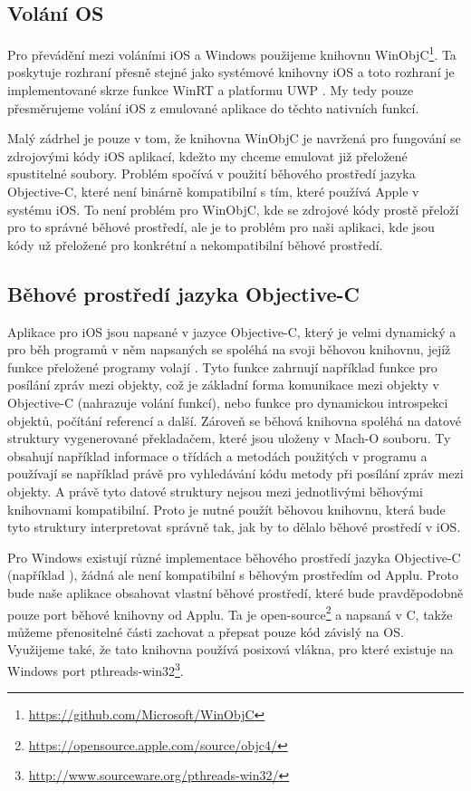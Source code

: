 \documentclass[12pt]{article}
\newcommand{\Rplus}{\protect\hspace{-.1em}\protect\raisebox{.35ex}{\smaller{\smaller\textbf{+}}}}
\newcommand{\Cpp}{\mbox{C\Rplus\Rplus}\xspace}
\begin{document}
\subsection*{Volání OS}
\label{sec:winobjc}

Pro převádění mezi voláními iOS a Windows použijeme knihovnu WinObjC\footnote{\url{https://github.com/Microsoft/WinObjC}}.
Ta poskytuje rozhraní přesně stejné jako systémové knihovny iOS a toto rozhraní je implementované skrze funkce WinRT a platformu UWP \cite{winobjc}.
My tedy pouze přesměrujeme volání iOS z emulované aplikace do těchto nativních funkcí.

Malý zádrhel je pouze v tom, že knihovna WinObjC je navržená pro fungování se zdrojovými kódy iOS aplikací, kdežto my chceme emulovat již přeložené spustitelné soubory.
Problém spočívá v použití běhového prostředí jazyka Objective-C, které není binárně kompatibilní s tím, které používá Apple v systému iOS.
To není problém pro WinObjC, kde se zdrojové kódy prostě přeloží pro to správné běhové prostředí, ale je to problém pro naši aplikaci, kde jsou kódy už přeložené pro konkrétní a nekompatibilní běhové prostředí.

\subsection*{Běhové prostředí jazyka Objective-C}

Aplikace pro iOS jsou napsané v jazyce Objective-C, který je velmi dynamický a pro běh programů v něm napsaných se spoléhá na svoji běhovou knihovnu, jejíž funkce přeložené programy volají \cite{objc, understandingObjc}.
Tyto funkce zahrnují například funkce pro posílání zpráv mezi objekty, což je základní forma komunikace mezi objekty v Objective-C (nahrazuje volání funkcí), nebo funkce pro dynamickou introspekci objektů, počítání referencí a další.
Zároveň se běhová knihovna spoléhá na datové struktury vygenerované překladačem, které jsou uloženy v Mach-O souboru.
Ty obsahují například informace o třídách a metodách použitých v programu a používají se například právě pro vyhledávání kódu metody při posílání zpráv mezi objekty.
A právě tyto datové struktury nejsou mezi jednotlivými běhovými knihovnami kompatibilní.
Proto je nutné použít běhovou knihovnu, která bude tyto struktury interpretovat správně tak, jak by to dělalo běhové prostředí v iOS.

Pro Windows existují různé implementace běhového prostředí jazyka Objective-C (například \cite{modernObjc, gnustep}), žádná ale není kompatibilní s běhovým prostředím od Applu.
Proto bude naše aplikace obsahovat vlastní běhové prostředí, které bude pravděpodobně pouze port běhové knihovny od Applu.
Ta je open-source\footnote{\url{https://opensource.apple.com/source/objc4/}} a napsaná v \Cpp, takže můžeme přenositelné části zachovat a přepsat pouze kód závislý na OS.
Využijeme také, že tato knihovna používá posixová vlákna, pro které existuje na Windows port pthreads-win32\footnote{\url{http://www.sourceware.org/pthreads-win32/}}.



\end{document}
